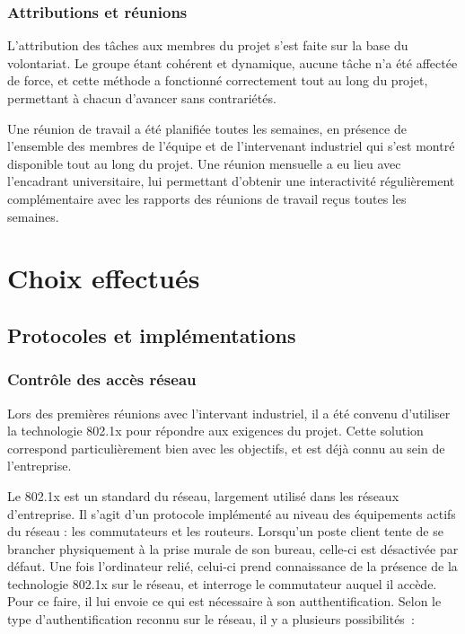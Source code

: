 \subsubsection{Attributions et réunions}

L'attribution des tâches aux membres du projet s'est faite sur la base du volontariat. Le groupe étant cohérent et dynamique, aucune tâche n'a été affectée de force, et cette méthode a fonctionné correctement tout au long du projet, permettant à chacun d'avancer sans contrariétés.

Une réunion de travail a été planifiée toutes les semaines, en présence de l'ensemble des membres de l'équipe et de l'intervenant industriel qui s'est montré disponible tout au long du projet. Une réunion mensuelle a eu lieu avec l'encadrant universitaire, lui permettant d'obtenir une interactivité régulièrement complémentaire avec les rapports des réunions de travail reçus toutes les semaines.

\section{Choix effectués}
\subsection{Protocoles et implémentations}
\subsubsection{Contrôle des accès réseau}

Lors des premières réunions avec l'intervant industriel, il a été convenu d'utiliser la technologie 802.1x pour répondre aux exigences du projet. Cette solution correspond particulièrement bien avec les objectifs, et est déjà connu au sein de l'entreprise.

Le 802.1x est un standard du réseau, largement utilisé dans les réseaux d'entreprise. Il s'agit d'un protocole implémenté au niveau des équipements actifs du réseau : les commutateurs et les routeurs. Lorsqu'un poste client tente de se brancher physiquement à la prise murale de son bureau, celle-ci est désactivée par défaut. Une fois l'ordinateur relié, celui-ci prend connaissance de la présence de la technologie 802.1x sur le réseau, et interroge le commutateur auquel il accède. Pour ce faire, il lui envoie ce qui est nécessaire à son autthentification. Selon le type d'authentification reconnu sur le réseau, il y a plusieurs possibilités~:

